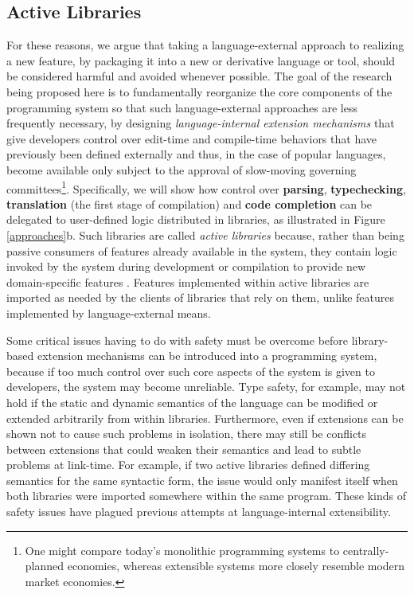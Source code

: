 \subsection{Active Libraries}
For these reasons, we argue that taking a language-external approach to realizing a new feature, by packaging it into a new or derivative language or tool, should be considered harmful and avoided whenever possible. The goal of the research being proposed here is to fundamentally reorganize the core components of the programming system so that such language-external approaches are less frequently necessary, by designing \emph{language-internal extension mechanisms} that give developers control over edit-time and compile-time behaviors that have previously been defined externally and thus, in the case of popular languages, become available only subject to the approval of slow-moving governing committees\footnote{One might compare today's monolithic programming systems to  {centrally-planned} economies, whereas extensible\- systems more closely resemble modern market economies.}. Specifically, we will show how control over \textbf{parsing}, \textbf{typechecking}, \textbf{translation} (the first stage of compilation) and \textbf{code completion} can be delegated to user-defined logic distributed in {libraries}, as illustrated in Figure \ref{approaches}b. 
Such libraries are called \emph{active libraries} because, rather than being passive consumers of features already available in the system, they contain logic invoked by the system during development or compilation to provide new domain-specific features  \cite{active-libraries}. Features implemented within active libraries are imported as needed by the clients of libraries that rely on them, unlike features implemented by language-external means.

Some critical issues having to do with {safety} must be overcome before library-based extension mechanisms can be introduced into a programming system, because if too much control over such core aspects of the system is given  to developers, the system may become unreliable. 
Type safety, for example, may not hold if the static and dynamic semantics of the language can be modified or extended arbitrarily from within libraries. Furthermore, even if extensions can be shown not to cause such problems in isolation, there may still be conflicts between extensions that could weaken their semantics and lead to subtle problems at link-time. For example, if two active libraries defined differing semantics for the same syntactic form, the issue would only manifest itself when both libraries were imported somewhere within the same program. These kinds of safety issues have plagued previous attempts at language-internal extensibility.%



